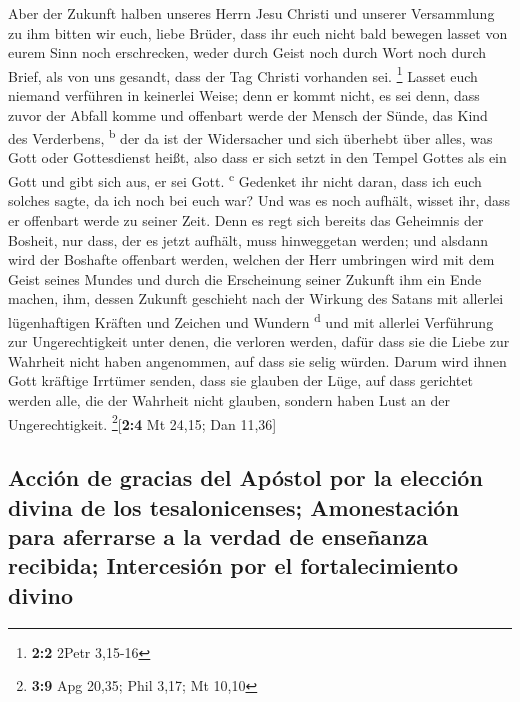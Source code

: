  Aber der Zukunft halben unseres Herrn Jesu Christi und
unserer Versammlung zu ihm bitten wir euch, liebe Brüder, 
dass ihr euch nicht bald bewegen lasset von eurem Sinn noch erschrecken,
weder durch Geist noch durch Wort noch durch Brief, als von uns gesandt,
dass der Tag Christi vorhanden sei. \footnote{\textbf{2:2} 2Petr 3,15-16}
 Lasset euch niemand verführen in keinerlei Weise; denn er
kommt nicht, es sei denn, dass zuvor der Abfall komme und offenbart
werde der Mensch der Sünde, das Kind des Verderbens, \textsuperscript{b}
 der da ist der Widersacher und sich überhebt über alles,
was Gott oder Gottesdienst heißt, also dass er sich setzt in den Tempel
Gottes als ein Gott und gibt sich aus, er sei Gott. \textsuperscript{c}
 Gedenket ihr nicht daran, dass ich euch solches sagte, da
ich noch bei euch war?  Und was es noch aufhält, wisset
ihr, dass er offenbart werde zu seiner Zeit.  Denn es regt
sich bereits das Geheimnis der Bosheit, nur dass, der es jetzt aufhält,
muss hinweggetan werden;  und alsdann wird der Boshafte
offenbart werden, welchen der Herr umbringen wird mit dem Geist seines
Mundes und durch die Erscheinung seiner Zukunft ihm ein Ende machen,
 ihm, dessen Zukunft geschieht nach der Wirkung des Satans
mit allerlei lügenhaftigen Kräften und Zeichen und Wundern
\textsuperscript{d}  und mit allerlei Verführung zur
Ungerechtigkeit unter denen, die verloren werden, dafür dass sie die
Liebe zur Wahrheit nicht haben angenommen, auf dass sie selig würden.
 Darum wird ihnen Gott kräftige Irrtümer senden, dass sie
glauben der Lüge,  auf dass gerichtet werden alle, die
der Wahrheit nicht glauben, sondern haben Lust an der Ungerechtigkeit.
\footnote{\textbf{3:9} Apg 20,35; Phil 3,17; Mt 10,10}{[}\textbf{2:4} Mt
24,15; Dan 11,36{]}

\hypertarget{acciuxf3n-de-gracias-del-apuxf3stol-por-la-elecciuxf3n-divina-de-los-tesalonicenses-amonestaciuxf3n-para-aferrarse-a-la-verdad-de-enseuxf1anza-recibida-intercesiuxf3n-por-el-fortalecimiento-divino}{%
\subsection{Acción de gracias del Apóstol por la elección divina de los
tesalonicenses; Amonestación para aferrarse a la verdad de enseñanza
recibida; Intercesión por el fortalecimiento
divino}\label{acciuxf3n-de-gracias-del-apuxf3stol-por-la-elecciuxf3n-divina-de-los-tesalonicenses-amonestaciuxf3n-para-aferrarse-a-la-verdad-de-enseuxf1anza-recibida-intercesiuxf3n-por-el-fortalecimiento-divino}}

